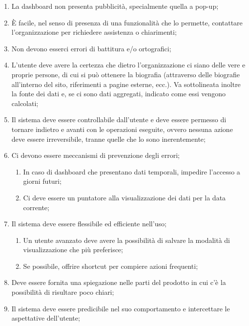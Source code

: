 \begin{enumerate}
\begin{enumerate}[label=\alph*.]
    \end{enumerate}
    \item La dashboard non presenta pubblicità, specialmente quella a pop-up;\label{lg:21}
    \item \`E facile, nel senso di presenza di una funzionalità che lo permette, contattare l'organizzazione per richiedere assistenza o chiarimenti\label{lg:22};
    \item Non devono esserci errori di battitura e/o ortografici\label{lg:23};
    \item L'utente deve avere la certezza che dietro l'organizzazione ci siano delle vere e proprie persone, di cui si può ottenere la biografia (attraverso delle biografie all'interno del sito, riferimenti a pagine esterne, ecc.). Va sottolineata inoltre la fonte dei dati e, se ci sono dati aggregati, indicato come essi vengono calcolati;\label{lg:24}
    \item Il sistema deve essere controllabile dall'utente e deve essere permesso di tornare indietro e avanti con le operazioni eseguite, ovvero nessuna azione deve essere irreversibile, tranne quelle che lo sono inerentemente;\label{lg:25}
    \item Ci devono essere meccanismi di prevenzione degli errori;\label{lg:26}
    \begin{enumerate}[label=\alph*.]
        \item In caso di dashboard che presentano dati temporali, impedire l'accesso a giorni futuri;\label{lg:26.a}
        \item Ci deve essere un puntatore alla visualizzazione dei dati per la data corrente;
    \end{enumerate}
\item Il sistema deve essere flessibile ed efficiente nell'uso;\label{lg:27}
    \begin{enumerate}[label=\alph*.]
        \item Un utente avanzato deve avere la possibilità di salvare la modalità di visualizzazione che più preferisce;\label{lg:27.a}
        \item Se possibile, offrire shortcut per compiere azioni frequenti;\label{lg:27.b}
    \end{enumerate}
    \item Deve essere fornita una spiegazione nelle parti del prodotto in cui c'è la possibilità di risultare poco chiari;\label{lg:28}
    \item Il sistema deve essere predicibile nel suo comportamento e intercettare le aspettative dell'utente;\label{lg:29}

\end{enumerate}
